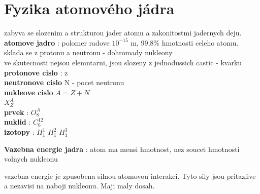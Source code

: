 \documentclass{report}
\begin{document}
\section{Fyzika atomového jádra}
\vspace{0.5cm}
zabyva se slozenim a strukturou jader atomu a zakonitostmi jadernych deju. \\
\textbf{atomove jadro} : polomer radove $10^{-15}$ m, 99,8\% hmotnosti celeho atomu. \\
sklada se z protonu a neutronu - dohromady nukleony \\
ve skutecnosti nejsou elemntarni, jsou slozeny z jednodussich castic - kvarku \\
\textbf{protonove cislo} : z \\
\textbf{neutronove cislo } N - pocet neutronu \\
\textbf{nukleove cislo} $A=Z+N$ \\
$X^A_Z$ \\
\textbf{prvek} : $O^A_8$ \\
\textbf{nuklid} :  $C^{12}_6$ \\
\textbf{izotopy} : $H_1^1$  $H^2_1$  $H^3_1$ \\


\textbf{Vazebna energie jadra} : atom ma mensi hmotnost, nez soucet hmotnosti volnych nukleonu

vazebna energie je zpusobena silnou atomovou interakci. Tyto sily jsou pritazlive a nezavisi na naboji nukleonu. Maji maly dosah. \\
\end{document}
